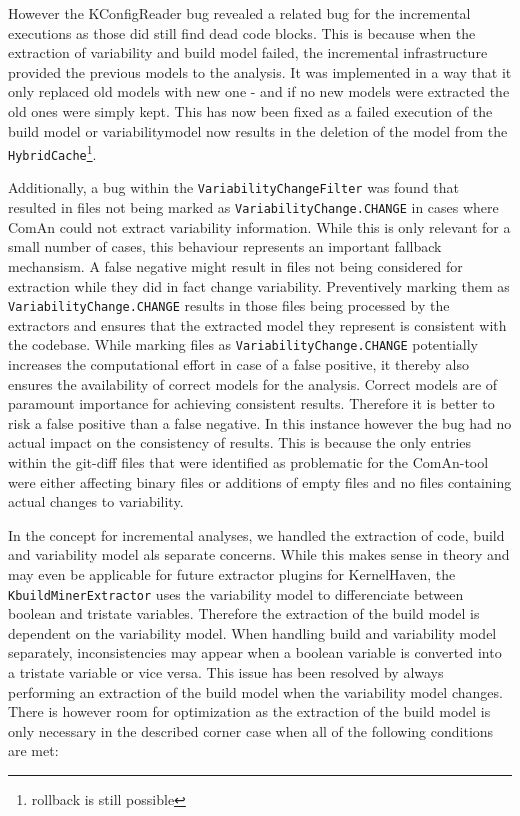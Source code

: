 \documentclass[a4paper]{article}
\begin{document}
However the KConfigReader bug revealed a related bug for the incremental executions as those did still find dead code blocks. This is because when the extraction of variability and build model failed, the incremental infrastructure provided the previous models to the analysis. It was implemented in a way that it only replaced old models with new one - and if no new models were extracted the old ones were simply kept. This has now been fixed as a failed execution of the build model or variabilitymodel now results in the deletion of the model from the \texttt{Hybrid\-Cache}\footnote{rollback is still possible}.

Additionally, a bug within the \texttt{VariabilityChangeFilter} was found that resulted in files not being marked as \texttt{VariabilityChange.CHANGE} in cases where ComAn could not extract variability information. While this is only relevant for a small number of cases, this behaviour represents an important fallback mechansism. A false negative might result in files not being considered for extraction while they did in fact change variability. Preventively marking them as \texttt{VariabilityChange.CHANGE} results in those files being processed by the extractors and ensures that the extracted model they represent is consistent with the codebase. While marking files as \texttt{VariabilityChange.CHANGE} potentially increases the computational effort in case of a false positive, it thereby also ensures the availability of correct models for the analysis. Correct models are of paramount importance for achieving consistent results. Therefore it is better to risk a false positive than a false negative. In this instance however the bug had no actual impact on the consistency of results. This is because the only entries within the git-diff files that were identified as problematic for the ComAn-tool were either affecting binary files or additions of empty files and no files containing actual changes to variability.

In the concept for incremental analyses, we handled the extraction of code, build and variability model als separate concerns. While this makes sense in theory and may even be applicable for future extractor plugins for KernelHaven, the \texttt{KbuildMinerExtractor} uses the variability model to differenciate between boolean and tristate variables. Therefore the extraction of the build model is dependent on the variability model. When handling build and variability model separately, inconsistencies may appear when a boolean variable is converted into a tristate variable or vice versa. This issue has been resolved by always performing an extraction of the build model when the variability model changes. There is however room for optimization as the extraction of the build model is only necessary in the described corner case when all of the following conditions are met:
\end{document}

